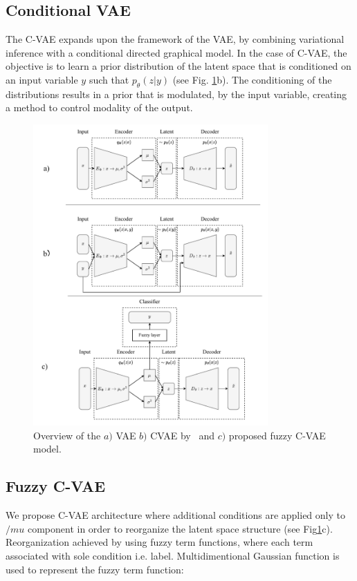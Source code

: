 \documentclass[runningheads]{llncs}
\begin{document}
\subsection{Conditional VAE}
The C-VAE expands upon the framework of the VAE, by combining variational inference with a conditional directed graphical model. 
In the case of C-VAE, the objective is to learn a prior distribution of the latent space that is conditioned on an input variable $y$ such that $p_\theta (z|y)$ (see Fig. \ref{fig:overview}b).
The conditioning of the distributions results in a prior that is modulated, by the input variable, creating a method to control modality of the output. 

\begin{figure}
    \centering
    \includegraphics[width=0.8\textwidth]{fig_1.pdf}
    \caption{Overview of the $a)$ VAE $b)$ CVAE by~\cite{SohnCVAE} and $c)$ proposed fuzzy C-VAE model.}
    \label{fig:overview}
\end{figure}

\subsection{Fuzzy C-VAE}

We propose C-VAE architecture where additional conditions are applied only to $/mu$ component in order to reorganize the latent space structure (see Fig\ref{fig:overview}c).
Reorganization achieved by using fuzzy term functions, where each term associated with sole condition i.e. label.
Multidimentional Gaussian function is used to represent the fuzzy term function:
\end{document}
